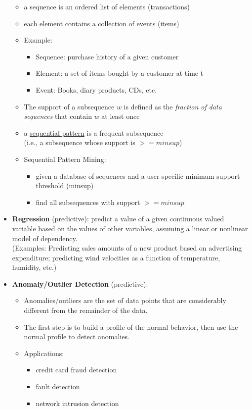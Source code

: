 \documentclass[10pt,a4paper]{article}
\begin{document}
\begin{itemize}
	\begin{itemize}
		\item a sequence is an ordered list of elements (transactions)
		\item each element contains a collection of events (items)
		\item Example:
		\begin{itemize}
			\item Sequence: purchase history of a given customer
			\item Element: a set of items bought by a customer at time t
			\item Event: Books, diary products, CDs, etc.
		\end{itemize}
		\item The support of a subsequence $w$ is defined as the \textit{fraction of data sequences} that contain $w$ at least once
		\item a \uline{sequential pattern} is a frequent subsequence \\(i.e., a subsequence whose support is $>= minsup$) 
		\item Sequential Pattern Mining:
		\begin{itemize}
			\item given a database of sequences and a user-specific minimum support threshold (minsup)
			\item find all subsequences with support $>= minsup$
		\end{itemize}
\end{itemize}		
	\item \textbf{Regression} (predictive): predict a value of a given continuous valued variable based on the values of other variables, assuming a linear or nonlinear model of dependency. \\ 
	(Examples: Predicting sales amounts of a new product based on advertising expenditure; predicting wind velocities as a function of temperature, humidity, etc.)
	\item \textbf{Anomaly/Outlier Detection} (predictive): 
	\begin{itemize}
		\item Anomalies/outliers are the set of data points that are considerably different from the remainder of the data. 
		\item  The first step is to build a profile of the normal behavior, then use the normal profile to detect anomalies.
		\item Applications: 
		\begin{itemize}
			\item credit card fraud detection
			\item fault detection
			\item network intrusion detection
		\end{itemize}
	\end{itemize}	
\end{itemize}
\end{document}
